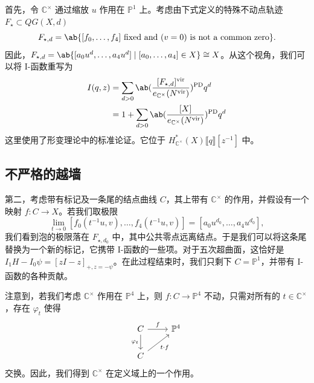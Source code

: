 \documentclass{amsart}
\theoremstyle{definition}
\theoremstyle{remark}
\theoremstyle{plain}
\theoremstyle{definition}
\theoremstyle{remark}
\newcommand{\C}{\mathbb{C}}
\renewcommand{\P}{\mathbb{P}}
\newcommand{\mr}[1]{\mathrm{#1}}
\newcommand{\1}{\mathbf{1}}
\newcommand{\2}{\mathbf{2}}
\newcommand{\3}{\mathbf{3}}
\newcommand{\vir}{\mr{vir}}
\newcommand{\ps}[1]{\llbracket #1 \rrbracket}
\begin{document}
首先，令 \(\C^{\times}\) 通过缩放 \(u\) 作用在 \(\P^1\) 上。考虑由下式定义的特殊不动点轨迹 \(F_{\star} \subset QG(X, d)\)
\[ F_{\star,d} = \ab\{ [f_0, \ldots, f_4] \text{ fixed and } (v=0) \text{ is not a common zero} \}. \]
因此，\(F_{\star,d} = \ab\{ [a_0 u^d, \ldots, a_4 u^d] \mid [a_0, \ldots, a_4] \in X \} \cong X\)。从这个视角，我们可以将 I-函数重写为
\begin{align*}
    I(q,z) &= \sum_{d > 0} \ab(\frac{[F_{\star, d}]^{\vir}}{e_{\C^{\times}}(N^{\vir})})^{\mr{PD}} q^d \\
    &= 1 + \sum_{d > 0} \ab( \frac{[X]}{e_{\C^{\times}}(N^{\vir})})^{\mr{PD}} q^d
\end{align*}
这里使用了形变理论中的标准论证。它位于 \(H^*_{\C^{\times}}(X) \ps{q}[z^{-1}]\) 中。

\subsection{不严格的越墙}%
\label{sub:Wall-crossing without rigor}


第二，考虑带有标记及一条尾的结点曲线 \(C\)，其上带有 \(\C^{\times}\) 的作用，并假设有一个映射 \(f \colon C \to X\)。若我们取极限
\[ \lim_{t \to 0} [f_0(t^{-1}u, v), \ldots, f_4(t^{-1}u, v)] = [a_0 u^{d_0}, \ldots, a_4 u^{d_0}], \]
我们看到泡的极限落在 \(F_{\star, d_0}\) 中，其中公共零点远离结点。于是我们可以将这条尾替换为一个新的标记，它携带 I-函数的一些项。对于五次超曲面，这恰好是 \(I_1 H - I_0 \psi = [zI-z]_{+, z = -\psi}\)。在此过程结束时，我们只剩下 \(C = \P^1\)，并带有 I-函数的各种贡献。

注意到，若我们考虑 \(\C^{\times}\) 作用在 \(\P^4\) 上，则 \(f \colon C \to \P^4\) 不动，只需对所有的 \(t \in \C^{\times}\)，存在 \(\varphi_t\) 使得
\begin{equation*}
\begin{tikzcd}
    C \ar{r}{f} \ar{d}[swap]{\varphi_t} & \P^4 \\
    C \ar{ur}[swap]{t \cdot f}
\end{tikzcd}
\end{equation*}
交换。因此，我们得到 \(\C^{\times}\) 在定义域上的一个作用。
\end{document}
